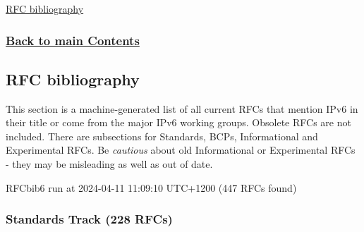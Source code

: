 \documentclass[
]{article}
\begin{document}
\hyperref[rfc-bibliography]{RFC bibliography}

\subsubsection{\texorpdfstring{\hyperref[list-of-contents]{Back to main
Contents}}{Back to main Contents}}\label{back-to-main-contents-9}

\pagebreak

\subsection{RFC bibliography}\label{rfc-bibliography}

This section is a machine-generated list of all current RFCs that
mention IPv6 in their title or come from the major IPv6 working groups.
Obsolete RFCs are not included. There are subsections for Standards,
BCPs, Informational and Experimental RFCs. Be \emph{cautious} about old
Informational or Experimental RFCs - they may be misleading as well as
out of date.

RFCbib6 run at 2024-04-11 11:09:10 UTC+1200 (447 RFCs found)

\subsubsection{Standards Track (228
RFCs)}\label{standards-track-228-rfcs}
\end{document}
